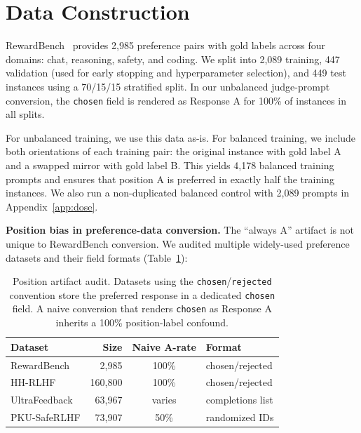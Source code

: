 \documentclass[letterpaper]{article}
\begin{document}
\clearpage

\section{Data Construction}
\label{app:data}

RewardBench~\citep{lambert2024rewardbench} provides 2,985 preference pairs with gold labels across four domains: chat, reasoning, safety, and coding. We split into 2,089 training, 447 validation (used for early stopping and hyperparameter selection), and 449 test instances using a 70/15/15 stratified split. In our unbalanced judge-prompt conversion, the \texttt{chosen} field is rendered as Response A for 100\% of instances in all splits.

For unbalanced training, we use this data as-is. For balanced training, we include both orientations of each training pair: the original instance with gold label A and a swapped mirror with gold label B. This yields 4,178 balanced training prompts and ensures that position A is preferred in exactly half the training instances. We also run a non-duplicated balanced control with 2,089 prompts in Appendix~\ref{app:dose}.

\textbf{Position bias in preference-data conversion.} The ``always A'' artifact is not unique to RewardBench conversion. We audited multiple widely-used preference datasets and their field formats (Table~\ref{tab:dataset_audit}):

\begin{table}[htbp]
\centering
\footnotesize
\setlength{\tabcolsep}{2pt}
\begin{tabular}{lrcl}
\toprule
\textbf{Dataset} & \textbf{Size} & \textbf{Naive A-rate} & \textbf{Format} \\
\midrule
RewardBench & 2,985 & 100\% & chosen/rejected \\
HH-RLHF & 160,800 & 100\% & chosen/rejected \\
UltraFeedback & 63,967 & varies & completions list \\
PKU-SafeRLHF & 73,907 & 50\% & randomized IDs \\
\bottomrule
\end{tabular}
\caption{Position artifact audit. Datasets using the \texttt{chosen}/\texttt{rejected} convention store the preferred response in a dedicated \texttt{chosen} field. A naive conversion that renders \texttt{chosen} as Response A inherits a 100\% position-label confound.}
\label{tab:dataset_audit}
\end{table}
\end{document}
